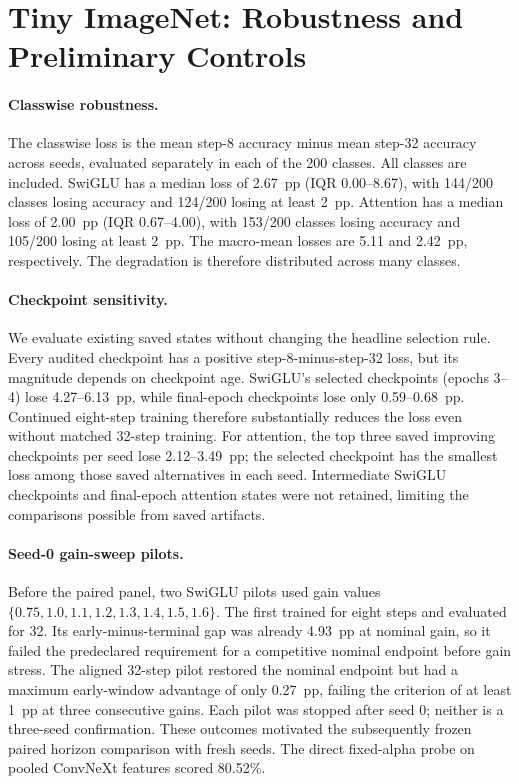 \section{Tiny ImageNet: Robustness and Preliminary Controls}
\label{app:modern_robustness}

\paragraph{Classwise robustness.}
The classwise loss is the mean step-8 accuracy minus mean step-32 accuracy
across seeds, evaluated separately in each of the 200 classes. All classes
are included. SwiGLU has a median loss of 2.67~pp (IQR 0.00--8.67), with
144/200 classes losing accuracy and 124/200 losing at least 2~pp. Attention
has a median loss of 2.00~pp (IQR 0.67--4.00), with 153/200 classes losing
accuracy and 105/200 losing at least 2~pp. The macro-mean losses are 5.11
and 2.42~pp, respectively. The degradation is therefore distributed across
many classes.

\paragraph{Checkpoint sensitivity.}
We evaluate existing saved states without changing the headline selection
rule. Every audited checkpoint has a positive step-8-minus-step-32 loss,
but its magnitude depends on checkpoint age. SwiGLU's selected checkpoints
(epochs 3--4) lose 4.27--6.13~pp, while final-epoch checkpoints lose only
0.59--0.68~pp. Continued eight-step training therefore substantially reduces
the loss even without matched 32-step training. For attention, the top three
saved improving checkpoints per seed lose 2.12--3.49~pp; the selected
checkpoint has the smallest loss among those saved alternatives in each seed.
Intermediate SwiGLU checkpoints and final-epoch attention states were not
retained, limiting the comparisons possible from saved artifacts.



\paragraph{Seed-0 gain-sweep pilots.}
Before the paired panel, two SwiGLU pilots used gain values
$\{0.75,1.0,1.1,1.2,1.3,1.4,1.5,1.6\}$. The first trained for eight steps
and evaluated for 32. Its early-minus-terminal gap was already 4.93~pp at
nominal gain, so it failed the predeclared requirement for a competitive
nominal endpoint before gain stress. The aligned 32-step pilot restored the
nominal endpoint but had a maximum early-window advantage of only 0.27~pp,
failing the criterion of at least 1~pp at three consecutive gains. Each pilot
was stopped after seed 0; neither is a three-seed confirmation. These outcomes
motivated the subsequently frozen paired horizon comparison with fresh seeds.
The direct fixed-alpha probe on pooled ConvNeXt features scored 80.52\%.

